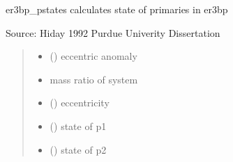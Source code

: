 \documentclass[letterpaper,10pt,english]{sphinxmanual}
\begin{document}

\begin{fulllineitems}
\label{\detokenize{models:pyraa.models.er3bp_pstates}}
\pysigstartsignatures
{}
\pysigstopsignatures
\sphinxAtStartPar
er3bp\_pstates \sphinxhyphen{} calculates state of primaries in er3bp

\sphinxAtStartPar
Source: Hiday 1992 Purdue Univerity Dissertation
\begin{quote}\begin{description}
\begin{itemize}
\item {} 
\sphinxAtStartPar
{} () \sphinxhyphen{}\sphinxhyphen{} eccentric anomaly

\item {} 
\sphinxAtStartPar
{} \sphinxhyphen{}\sphinxhyphen{} mass ratio of system

\item {} 
\sphinxAtStartPar
{} () \sphinxhyphen{}\sphinxhyphen{} eccentricity

\end{itemize}

\sphinxAtStartPar
\begin{itemize}
\item {} 
\sphinxAtStartPar
{} () \sphinxhyphen{}\sphinxhyphen{} state of p1

\item {} 
\sphinxAtStartPar
{} () \sphinxhyphen{}\sphinxhyphen{} state of p2

\end{itemize}


\end{description}\end{quote}

\end{fulllineitems}
\end{document}

